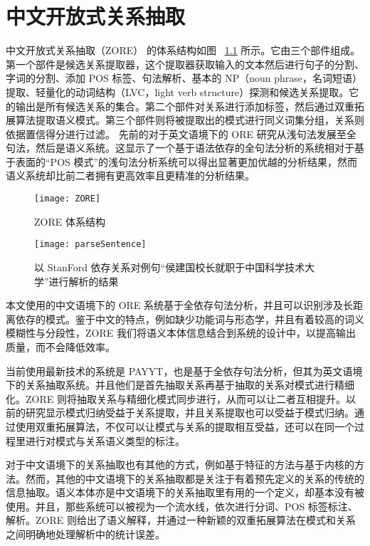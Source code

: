 \chapter{中文开放式关系抽取}
\label{chap:zore}

中文开放式关系抽取（ZORE）\citep{ZORE} 的体系结构如图 ~\ref{fig:ZORE} 所示。它由三个部件组成。第一个部件是候选关系提取器，这个提取器获取输入的文本然后进行句子的分割、字词的分割、添加 POS 标签、句法解析、基本的 NP（noun phrase，名词短语） 提取、轻量化的动词结构（LVC，light verb structure）探测和候选关系提取。它的输出是所有候选关系的集合。第二个部件对关系进行添加标签，然后通过双重拓展算法提取语义模式。第三个部件则将被提取出的模式进行同义词集分组，关系则依据置信得分进行过滤。
先前的对于英文语境下的 ORE 研究从浅句法发展至全句法，然后是语义系统。这显示了一个基于语法依存的全句法分析的系统相对于基于表面的“POS 模式”的浅句法分析系统可以得出显著更加优越的分析结果，然而语义系统却比前二者拥有更高效率且更精准的分析结果。

\begin{figure}[h]
\centering
\texttt{[image: ZORE]}
\caption{ZORE 体系结构}\label{fig:ZORE}
\end{figure}

\begin{figure}[h]
\centering
\texttt{[image: parseSentence]}
\caption[句子解析结果]{以 StanFord 依存关系对例句“侯建国校长就职于中国科学技术大学”进行解析的结果}\label{fig:parseSentence}
\end{figure}

本文使用的中文语境下的 ORE 系统基于全依存句法分析，并且可以识别涉及长距离依存的模式。鉴于中文的特点，例如缺少功能词\citep{funcword}与形态学\citep{morphword}，并且有着较高的词义模糊性与分段性，ZORE 我们将语义本体信息结合到系统的设计中，以提高输出质量，而不会降低效率。

当前使用最新技术的系统是 PAYYT\citep{naka2012}，也是基于全依存句法分析，但其为英文语境下的关系抽取系统。并且他们是首先抽取关系再基于抽取的关系对模式进行精细化。ZORE 则将抽取关系与精细化模式同步进行，从而可以让二者互相提升。以前的研究显示模式归纳受益于关系提取\citep{naka2012}，并且关系提取也可以受益于模式归纳\citep{mau2012}。通过使用双重拓展算法，不仅可以让模式与关系的提取相互受益，还可以在同一个过程里进行对模式与关系语义类型的标注。

对于中文语境下的关系抽取也有其他的方式，例如基于特征的方法与基于内核的方法。然而，其他的中文语境下的关系抽取都是关注于有着预先定义的关系的传统的信息抽取。语义本体亦是中文语境下的关系抽取里有用的一个定义，却基本没有被使用。并且，那些系统可以被视为一个流水线，依次进行分词、POS 标签标注、解析。ZORE 则给出了语义解释，并通过一种新颖的双重拓展算法在模式和关系之间明确地处理解析中的统计误差。

